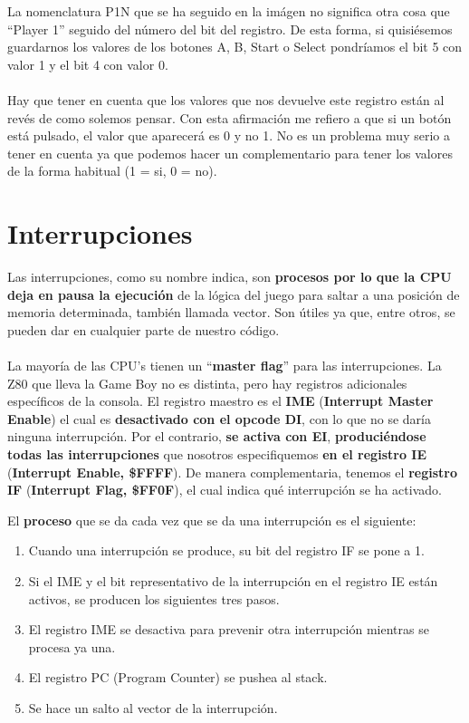 La nomenclatura P1N que se ha seguido en la imágen no significa otra cosa que ``Player 1'' seguido del número del bit del registro. De esta forma, si quisiésemos guardarnos los valores de los botones A, B, Start o Select pondríamos el bit 5 con valor 1 y el bit 4 con valor 0.
\\ \\
Hay que tener en cuenta que los valores que nos devuelve este registro están al revés de como solemos pensar. Con esta afirmación me refiero a que si un botón está pulsado, el valor que aparecerá es 0 y no 1. No es un problema muy serio a tener en cuenta ya que podemos hacer un complementario para tener los valores de la forma habitual (1 = si, 0 = no). 

\section{Interrupciones}
\label{anexo:interruptions}
Las interrupciones, como su nombre indica, son \textbf{procesos por lo que la CPU deja en pausa la ejecución} de la lógica del juego para saltar a una posición de memoria determinada, también llamada vector. Son útiles ya que, entre otros, se pueden dar en cualquier parte de nuestro código.
\\ \\
La mayoría de las CPU's tienen un ``\textbf{master flag}'' para las interrupciones. La Z80 que lleva la Game Boy no es distinta, pero hay registros adicionales específicos de la consola. El registro maestro es el \textbf{IME} (\textbf{Interrupt Master Enable}) el cual es \textbf{desactivado con el opcode DI}, con lo que no se daría ninguna interrupción. Por el contrario, \textbf{se activa con EI}, \textbf{produciéndose todas las interrupciones} que nosotros especifiquemos \textbf{en el registro IE} (\textbf{Interrupt Enable, \$FFFF}). De manera complementaria, tenemos el \textbf{registro IF} (\textbf{Interrupt Flag, \$FF0F}), el cual indica qué interrupción se ha activado.

\clearpage

El \textbf{proceso} que se da cada vez que se da una interrupción es el siguiente:

\begin{enumerate}
	\item Cuando una interrupción se produce, su bit del registro IF se pone a 1.
	\item Si el IME y el bit representativo de la interrupción en el registro IE están activos, se producen los siguientes tres pasos.
	\item El registro IME se desactiva para prevenir otra interrupción mientras se procesa ya una.
	\item El registro PC (Program Counter) se pushea al stack.
	\item Se hace un salto al vector de la interrupción.
\end{enumerate}


